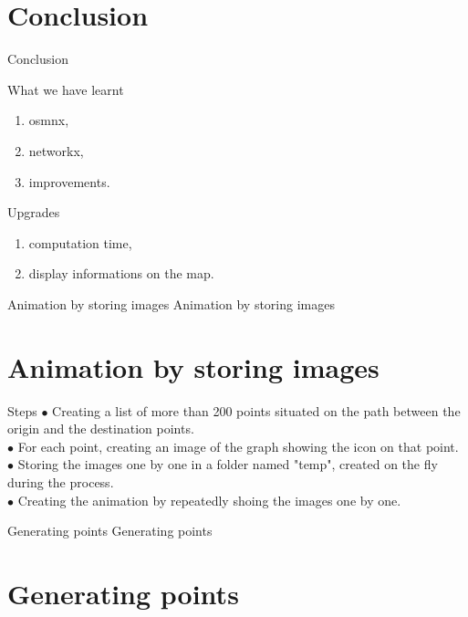 \documentclass[11pt, compress]{beamer}
\theoremstyle{definition}
\begin{document}
\section[Conclu]{Conclusion}
\begin{frame}{Conclusion}
\begin{block}{What we have learnt}
\begin{enumerate}[label=$\bullet$]
    \item osmnx,
    \item networkx,
    \item improvements.
\end{enumerate}
\end{block}

\begin{block}{Upgrades}
\begin{enumerate}[label=$\bullet$]
    \item computation time,
    \item display informations on the map. %
\end{enumerate}
\end{block}
\end{frame}
\begin{frame}{Animation by storing images}
\center \Large \Huge Animation by storing images
\section{Animation by storing images}
\end{frame} 



\begin{frame}{Steps}
$\bullet$ Creating a list of more than 200 points situated on the path between the origin and the destination points. \\
$\bullet$ For each point, creating an image of the graph showing the icon on that point. \\
$\bullet$ Storing the images one by one in a folder named "temp", created on the fly during the process. \\
$\bullet$ Creating the animation by repeatedly shoing the images one by one.
\end{frame} 

 

\begin{frame}{Generating points}
\center \Large \Huge Generating points
\section{Generating points}
\end{frame} 
\end{document}

